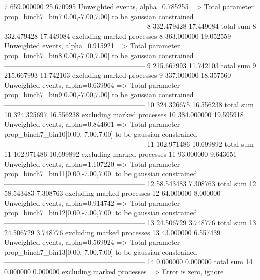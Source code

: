 7          659.000000      25.670995       Unweighted events, alpha=0.785255
  => Total parameter prop_binch7_bin7[0.00,-7.00,7.00] to be gaussian constrained
------------------------------------------------------------
8          332.479428      17.449084       total sum                     
8          332.479428      17.449084       excluding marked processes    
8          363.000000      19.052559       Unweighted events, alpha=0.915921
  => Total parameter prop_binch7_bin8[0.00,-7.00,7.00] to be gaussian constrained
------------------------------------------------------------
9          215.667993      11.742103       total sum                     
9          215.667993      11.742103       excluding marked processes    
9          337.000000      18.357560       Unweighted events, alpha=0.639964
  => Total parameter prop_binch7_bin9[0.00,-7.00,7.00] to be gaussian constrained
------------------------------------------------------------
10         324.326675      16.556238       total sum                     
10         324.325697      16.556238       excluding marked processes    
10         384.000000      19.595918       Unweighted events, alpha=0.844601
  => Total parameter prop_binch7_bin10[0.00,-7.00,7.00] to be gaussian constrained
------------------------------------------------------------
11         102.971486      10.699892       total sum                     
11         102.971486      10.699892       excluding marked processes    
11         93.000000       9.643651        Unweighted events, alpha=1.107220
  => Total parameter prop_binch7_bin11[0.00,-7.00,7.00] to be gaussian constrained
------------------------------------------------------------
12         58.543483       7.308763        total sum                     
12         58.543483       7.308763        excluding marked processes    
12         64.000000       8.000000        Unweighted events, alpha=0.914742
  => Total parameter prop_binch7_bin12[0.00,-7.00,7.00] to be gaussian constrained
------------------------------------------------------------
13         24.506729       3.748776        total sum                     
13         24.506729       3.748776        excluding marked processes    
13         43.000000       6.557439        Unweighted events, alpha=0.569924
  => Total parameter prop_binch7_bin13[0.00,-7.00,7.00] to be gaussian constrained
------------------------------------------------------------
14         0.000000        0.000000        total sum                     
14         0.000000        0.000000        excluding marked processes    
  => Error is zero, ignore      
